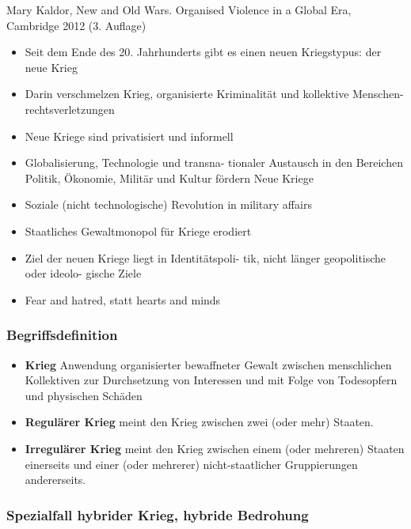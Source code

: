 {}\documentclass[a4paper]{article}
\providecommand{\tightlist}{\setlength{\itemsep}{1mm}\setlength{\parskip}{1mm}}
\begin{document}
Mary Kaldor, New and Old Wars. Organised Violence in a Global Era,
Cambridge 2012 (3. Auflage)

\begin{itemize}
	\tightlist
	\item
	      Seit dem Ende des 20. Jahrhunderts gibt es einen neuen Kriegstypus:
	      der neue Krieg
	\item
	      Darin verschmelzen Krieg, organisierte Kriminalität und kollektive
	      Menschen- rechtsverletzungen
	\item
	      Neue Kriege sind privatisiert und informell
	\item
	      Globalisierung, Technologie und transna- tionaler Austausch in den
	      Bereichen Politik, Ökonomie, Militär und Kultur fördern Neue Kriege
	\item
	      Soziale (nicht technologische) Revolution in military affairs
	\item
	      Staatliches Gewaltmonopol für Kriege erodiert
	\item
	      Ziel der neuen Kriege liegt in Identitätspoli- tik, nicht länger
	      geopolitische oder ideolo- gische Ziele
	\item
	      Fear and hatred, statt hearts and minds
\end{itemize}

\subsubsection{Begriffsdefinition}\label{begriffsdefinition}

\begin{itemize}
	\tightlist
	\item
	      \textbf{Krieg} Anwendung organisierter bewaffneter Gewalt zwischen
	      menschlichen Kollektiven zur Durchsetzung von Interessen und mit Folge
	      von Todesopfern und physischen Schäden
	\item
	      \textbf{Regulärer Krieg} meint den Krieg zwischen zwei (oder mehr)
	      Staaten.
	\item
	      \textbf{Irregulärer Krieg} meint den Krieg zwischen einem (oder
	      mehreren) Staaten einerseits und einer (oder mehrerer)
	      nicht-staatlicher Gruppierungen andererseits.
\end{itemize}

\subsubsection{Spezialfall hybrider Krieg, hybride
	Bedrohung}\label{spezialfall-hybrider-krieg-hybride-bedrohung}
\end{document}
